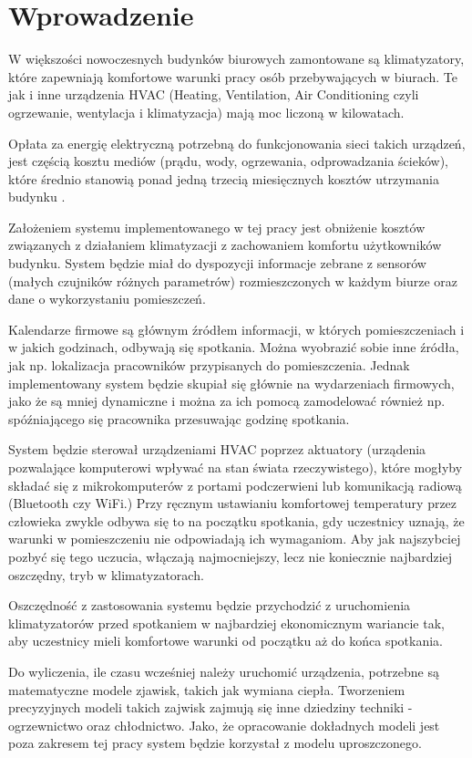 \chapter{Wprowadzenie}
W większości nowoczesnych budynków biurowych zamontowane są klimatyzatory, które zapewniają komfortowe warunki pracy osób przebywających w biurach. Te jak i inne urządzenia HVAC (Heating, Ventilation, Air Conditioning czyli ogrzewanie, wentylacja i klimatyzacja) mają moc liczoną w kilowatach.

Opłata za energię elektryczną potrzebną do funkcjonowania sieci takich urządzeń, jest częścią kosztu mediów (prądu, wody, ogrzewania, odprowadzania ścieków), które średnio stanowią ponad jedną trzecią miesięcznych kosztów utrzymania budynku \cite{bib:raportKoszty}.

Założeniem systemu implementowanego w tej pracy jest obniżenie kosztów związanych z działaniem klimatyzacji z zachowaniem komfortu użytkowników budynku. System będzie miał do dyspozycji informacje zebrane z sensorów (małych czujników różnych parametrów) rozmieszczonych w każdym biurze oraz dane o wykorzystaniu pomieszczeń. 



Kalendarze firmowe są głównym źródłem informacji, w których pomieszczeniach i w jakich godzinach, odbywają się spotkania. Można wyobrazić sobie inne źródła, jak np. lokalizacja pracowników przypisanych do pomieszczenia. Jednak implementowany system będzie skupiał się głównie na wydarzeniach firmowych, jako że są mniej dynamiczne i można za ich pomocą zamodelować również np. spóźniającego się pracownika przesuwając godzinę spotkania.

System będzie sterował urządzeniami HVAC poprzez aktuatory (urządenia pozwalające komputerowi wpływać na stan świata rzeczywistego), które mogłyby składać się z mikrokomputerów z portami podczerwieni lub komunikacją radiową (Bluetooth czy WiFi.)
Przy ręcznym ustawianiu komfortowej temperatury przez człowieka zwykle odbywa się to na początku spotkania, gdy uczestnicy uznają, że warunki w pomieszczeniu nie odpowiadają ich wymaganiom. Aby jak najszybciej pozbyć się tego uczucia, włączają najmocniejszy, lecz nie koniecznie najbardziej oszczędny, tryb w klimatyzatorach.

Oszczędność z zastosowania systemu będzie przychodzić z uruchomienia klimatyzatorów przed spotkaniem w najbardziej ekonomicznym wariancie tak, aby uczestnicy mieli komfortowe warunki od początku aż do końca spotkania. 

Do wyliczenia, ile czasu wcześniej należy uruchomić urządzenia, potrzebne są matematyczne modele zjawisk, takich jak wymiana ciepła. Tworzeniem precyzyjnych modeli takich zajwisk zajmują się inne dziedziny techniki - ogrzewnictwo oraz chłodnictwo. Jako, że opracowanie dokładnych modeli jest poza zakresem tej pracy system będzie korzystał z modelu uproszczonego. 
